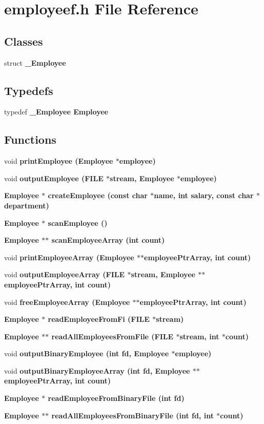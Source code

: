 \section{employeef.h File Reference}
\label{employeef_8h}
\subsection*{Classes}
\begin{CompactItemize}
\item 
struct \bf{\_\-Employee}
\end{CompactItemize}
\subsection*{Typedefs}
\begin{CompactItemize}
\item 
typedef \bf{\_\-Employee} \bf{Employee}
\end{CompactItemize}
\subsection*{Functions}
\begin{CompactItemize}
\item 
void \bf{print\-Employee} (\bf{Employee} $\ast$employee)
\item 
void \bf{output\-Employee} (FILE $\ast$stream, \bf{Employee} $\ast$employee)
\item 
\bf{Employee} $\ast$ \bf{create\-Employee} (const char $\ast$name, int salary, const char $\ast$department)
\item 
\bf{Employee} $\ast$ \bf{scan\-Employee} ()
\item 
\bf{Employee} $\ast$$\ast$ \bf{scan\-Employee\-Array} (int count)
\item 
void \bf{print\-Employee\-Array} (\bf{Employee} $\ast$$\ast$employee\-Ptr\-Array, int count)
\item 
void \bf{output\-Employee\-Array} (FILE $\ast$stream, \bf{Employee} $\ast$$\ast$employee\-Ptr\-Array, int count)
\item 
void \bf{free\-Employee\-Array} (\bf{Employee} $\ast$$\ast$employee\-Ptr\-Array, int count)
\item 
\bf{Employee} $\ast$ \bf{read\-Employee\-From\-Fi} (FILE $\ast$stream)
\item 
\bf{Employee} $\ast$$\ast$ \bf{read\-All\-Employees\-From\-File} (FILE $\ast$stream, int $\ast$count)
\item 
void \bf{output\-Binary\-Employee} (int fd, \bf{Employee} $\ast$employee)
\item 
void \bf{output\-Binary\-Employee\-Array} (int fd, \bf{Employee} $\ast$$\ast$employee\-Ptr\-Array, int count)
\item 
\bf{Employee} $\ast$ \bf{read\-Employee\-From\-Binary\-File} (int fd)
\item 
\bf{Employee} $\ast$$\ast$ \bf{read\-All\-Employees\-From\-Binary\-File} (int fd, int $\ast$count)
\end{CompactItemize}


